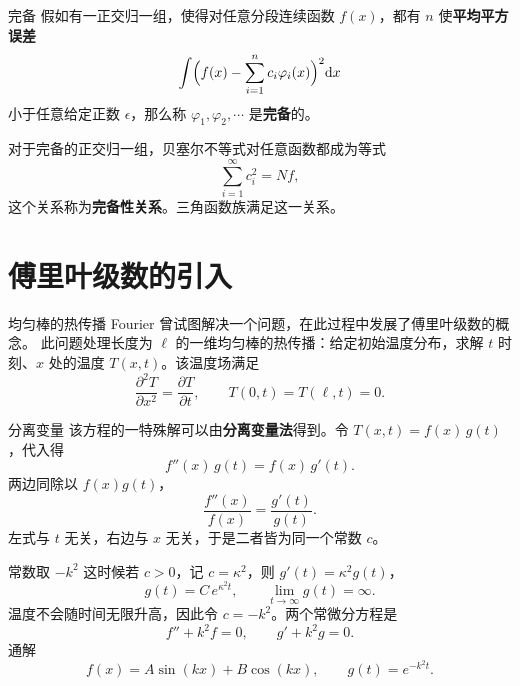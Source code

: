 \documentclass[fontset=windows, chinese, 10pt, xcolor=dvipsnames]{beamer}
\begin{document}
\begin{frame}{完备}
  假如有一正交归一组，使得对任意分段连续函数 $f(x)$，都有 $n$ 使\textbf{平均平方误差}
  \begin{equation*}
    \int\Bigl(f(x)-\sum_{i=1}^n c_i\varphi_i(x)\Bigr)^2\mathrm{d}x
  \end{equation*}
  小于任意给定正数 $\epsilon$，那么称 $\varphi_1,\varphi_2,\cdots$ 是\textbf{完备}的。
  \vspace{0.4em}

  对于完备的正交归一组，贝塞尔不等式对任意函数都成为等式
  \begin{equation*}
    \sum_{i=1}^{\infty} c_i^2=Nf,
  \end{equation*}
  这个关系称为\textbf{完备性关系}。三角函数族满足这一关系。
\end{frame}

\section{傅里叶级数的引入}

\begin{frame}{均匀棒的热传播}
  Fourier 曾试图解决一个问题，在此过程中发展了傅里叶级数的概念。
  此问题处理长度为 $\ell$ 的一维均匀棒的热传播：给定初始温度分布，求解 $t$ 时刻、$x$ 处的温度 $T(x,t)$。该温度场满足
  \begin{equation*}
    \frac{\partial^2 T}{\partial x^2}
      =\frac{\partial T}{\partial t},
    \qquad
    T(0,t)=T(\ell,t)=0.
  \end{equation*}
\end{frame}

\begin{frame}{分离变量}
  该方程的一特殊解可以由\textbf{分离变量法}得到。令 $T(x,t)=f(x)\,g(t)$，代入得
  \begin{equation*}
    f''(x)\,g(t)=f(x)\,g'(t).
  \end{equation*}
  两边同除以 $f(x)g(t)$，
  \begin{equation*}
    \frac{f''(x)}{f(x)}=\frac{g'(t)}{g(t)}.
  \end{equation*}
  左式与 $t$ 无关，右边与 $x$ 无关，于是二者皆为同一个常数 $c$。
\end{frame}

\begin{frame}{常数取 $-k^2$}
  这时候若 $c>0$，记 $c=\kappa^2$，则 $g'(t)=\kappa^2 g(t)$，
  \begin{equation*}
    g(t)=C\,e^{\kappa^2 t},
    \qquad
    \lim_{t\to\infty} g(t)=\infty.
  \end{equation*}
  温度不会随时间无限升高，因此令 $c=-k^2$。两个常微分方程是
  \begin{equation*}
    f''+k^2 f=0,
    \qquad
    g'+k^2 g=0.
  \end{equation*}
  通解
  \begin{equation*}
    f(x)=A\sin(kx)+B\cos(kx),
    \qquad
    g(t)=e^{-k^2 t}.
  \end{equation*}
\end{frame}
\end{document}
